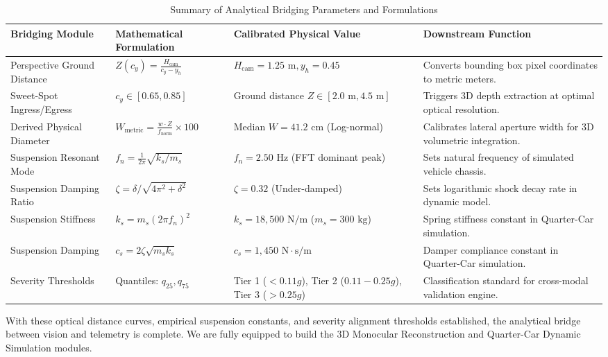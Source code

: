 \begin{table}[htbp]
\centering
\small
\caption{Summary of Analytical Bridging Parameters and Formulations}
\label{tab:bridging_summary}
\begin{tabularx}{\textwidth}{llp{3.8cm}X}
\toprule
\textbf{Bridging Module} & \textbf{Mathematical Formulation} & \textbf{Calibrated Physical Value} & \textbf{Downstream Function} \\
\midrule
Perspective Ground Distance & $Z(c_y) = \frac{H_{\text{cam}}}{c_y - y_h}$ & $H_{\text{cam}} = 1.25\text{ m}, y_h = 0.45$ & Converts bounding box pixel coordinates to metric meters. \\
Sweet-Spot Ingress/Egress & $c_y \in [0.65, 0.85]$ & Ground distance $Z \in [2.0\text{ m}, 4.5\text{ m}]$ & Triggers 3D depth extraction at optimal optical resolution. \\
Derived Physical Diameter & $W_{\text{metric}} = \frac{w \cdot Z}{f_{\text{norm}}} \times 100$ & Median $W = 41.2\text{ cm}$ (Log-normal) & Calibrates lateral aperture width for 3D volumetric integration. \\
Suspension Resonant Mode & $f_n = \frac{1}{2\pi}\sqrt{k_s / m_s}$ & $f_n = 2.50\text{ Hz}$ (FFT dominant peak) & Sets natural frequency of simulated vehicle chassis. \\
Suspension Damping Ratio & $\zeta = \delta / \sqrt{4\pi^2 + \delta^2}$ & $\zeta = 0.32$ (Under-damped) & Sets logarithmic shock decay rate in dynamic model. \\
Suspension Stiffness & $k_s = m_s (2\pi f_n)^2$ & $k_s = 18,500\text{ N/m}$ ($m_s = 300\text{ kg}$) & Spring stiffness constant in Quarter-Car simulation. \\
Suspension Damping & $c_s = 2\zeta\sqrt{m_s k_s}$ & $c_s = 1,450\text{ N}\cdot\text{s/m}$ & Damper compliance constant in Quarter-Car simulation. \\
Severity Thresholds & Quantiles: $q_{25}, q_{75}$ & Tier 1 ($<0.11g$), Tier 2 ($0.11-0.25g$), Tier 3 ($>0.25g$) & Classification standard for cross-modal validation engine. \\
\bottomrule
\end{tabularx}
\end{table}

With these optical distance curves, empirical suspension constants, and severity alignment thresholds established, the analytical bridge between vision and telemetry is complete. We are fully equipped to build the 3D Monocular Reconstruction and Quarter-Car Dynamic Simulation modules.

